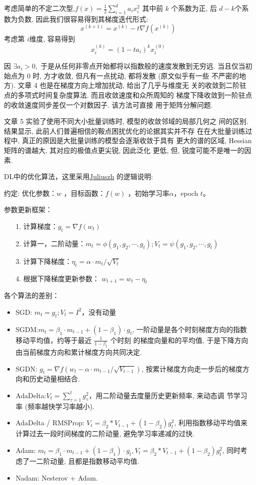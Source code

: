 \documentclass[UTF8]{ctexart}
\begin{document}
考虑简单的不定二次型,$f(x)=\frac{1}{2} \sum_{i=1}^{d} a_{i} x_{i}^{2}$
其中前 $k$ 个系数为正, 后
$d − k $个系数为负数, 因此我们很容易得到其梯度迭代形式:
$$x^{(k+1)}=x^{(k)}-t \nabla f\left(x^{(k)}\right)$$
考虑第 $i $维度, 容易得到
$$x_{i}^{(k)}=\left(1-t a_{i}\right)^{k} x_{i}^{(0)}$$

因 $\exists a_i > 0,$ 于是从任何非零点开始都将以指数般的速度发散到无穷远. 
当且仅当初始点为 0 时, 方才收敛, 但凡有一点扰动, 都将发散 (原文似乎有一些
不严密的地方). 文章 4 也是在梯度方向上增加扰动, 给出了几乎与维度无
关的收敛到二阶驻点的多项式时间复杂度算法. 而且收敛速度和众所周知的
梯度下降收敛到一阶驻点的收敛速度同步差仅一个对数因子. 该方法可直接
用于矩阵分解问题. 

文章 5 实验了使用不同大小批量训练时, 模型的收敛邻域的局部几何之
间的区别. 结果显示, 此前人们普遍相信的鞍点困扰优化的论据其实并不存
在在大批量训练过程中, 真正的原因是大批量训练的模型会逐渐收敛于具有
更大的谱的区域, Hessian 矩阵的谱越大, 其对应的极值点更尖锐, 因此泛化
更低, 但, 锐度可能不是唯一的因素.

DL中的优化算法，这里采用\href{https://zhuanlan.zhihu.com/p/32230623}{Juliuszh}
的逻辑说明:

约定: 优化参数：$w$ ，目标函数：$f(w)$ ，初始学习率$\alpha$，epoch $t$。

参数更新框架：
\begin{itemize}
	\item[1.] 计算梯度：$g_{t}=\nabla f\left(w_{t}\right)$
	\item[2.] 计算一，二阶动量：$m_{t}=\phi\left(g_{1}, g_{2},
	 \cdots, g_{t}\right); V_{t}=\psi\left(g_{1}, g_{2}, \cdots, g_{t}\right)$
	\item[3.] 计算下降梯度：$\eta_{t}=\alpha \cdot m_{t} / \sqrt{V_{t}}$
	\item[4.] 根据下降梯度更新参数： $w_{t+1}=w_{t}-\eta_{t}$
\end{itemize}

各个算法的差别：
\begin{itemize}
	\item SGD: $m_t=g_t; V_t=I^2$，没有动量
	\item SGDM:$m_{t}=\beta_{1} \cdot m_{t-1}+\left(1-\beta_{1}\right) \cdot g_{t}$,
	一阶动量是各个时刻梯度方向的指数移动平均值，约等于最近 $\frac{1}{1 - \beta_1}$ 个时刻
	的梯度向量和的平均值, 于是下降方向由当前梯度方向和累计梯度方向共同决定.
	\item SGDN: $g_{t}=\nabla f\left(w_{t}-\alpha \cdot m_{t-1} / \sqrt{V_{t-1}}\right)$,
	按累计梯度方向走一步后的梯度方向和历史动量相结合.
	\item AdaDelta:$V_{t}=\sum_{\tau=1}^{t} g_{\tau}^{2}$，用二阶动量去度量历史更新频率, 来动态调
	节学习率 (频率越快学习率越小).
	\item AdaDelta / RMSProp: $V_{t}=\beta_{2} * V_{t-1}+\left(1-\beta_{2}\right) g_{t}^{2}$,
	利用指数移动平均值来计算过去一段时间梯度的二阶动量, 避免学习率递减的过快.
	\item Adam: $m_{t}=\beta_{1} \cdot m_{t-1}+\left(1-\beta_{1}\right) \cdot g_{t}, 
	V_{t}=\beta_{2} * V_{t-1}+\left(1-\beta_{2}\right) g_{t}^{2}$,
	同时考虑了一二阶动量, 且都是指数移动平均值.
	\item Nadam: Nesterov + Adam.
\end{itemize}
\end{document}
